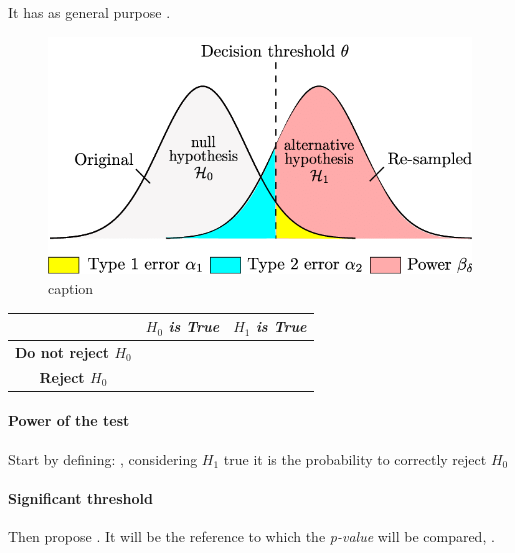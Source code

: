 It has as general purpose .
\begin{figure}[H]
    \begin{center}
        \includegraphics[width=\textwidth]{./chapters/2_statistics/04_frequentist_approach/6_images/1_statistical_hypothesis_testing.png}
    \end{center}
    \caption{caption}
    \label{fig:4.6.1_statistical_hypothesis_testing}
\end{figure}

\begin{center}
    \begin{tabular}{*{3}{|c}|}
    \hline
    & \textbf{$H_{0}$ \emph{is True}} & \textbf{$H_{1}$ \emph{is True}}\\
    \hline
        \textbf{Do not reject $H_{0}$} &  & \\
    \hline
        \textbf{Reject $H_{0}$} &  & \\
    \hline
    \end{tabular}
\end{center}

\paragraph{Power of the test}
Start by defining: , considering $H_{1}$ true it is the probability 
to correctly reject $H_{0}$

\paragraph{Significant threshold}
Then propose . It will be the
reference to which the \emph{p-value} will be compared, .

